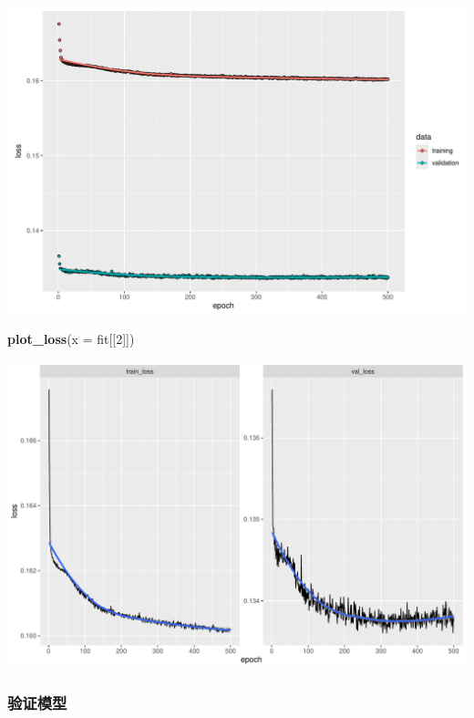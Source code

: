 \documentclass[
]{article}
\newenvironment{Shaded}{\begin{snugshade}}{\end{snugshade}}
\newcommand{\AttributeTok}[1]{\textcolor[rgb]{0.13,0.29,0.53}{#1}}
\newcommand{\CommentTok}[1]{\textcolor[rgb]{0.56,0.35,0.01}{\textit{#1}}}
\newcommand{\DecValTok}[1]{\textcolor[rgb]{0.00,0.00,0.81}{#1}}
\newcommand{\FunctionTok}[1]{\textcolor[rgb]{0.13,0.29,0.53}{\textbf{#1}}}
\newcommand{\NormalTok}[1]{#1}
\newcommand{\OtherTok}[1]{\textcolor[rgb]{0.56,0.35,0.01}{#1}}
\newcommand{\SpecialCharTok}[1]{\textcolor[rgb]{0.81,0.36,0.00}{\textbf{#1}}}
\begin{document}
\includegraphics{freMTPLfreq_fnn-zh-cn_files/figure-latex/unnamed-chunk-64-1.pdf}

\begin{Shaded}
\begin{Highlighting}[]
\FunctionTok{plot\_loss}\NormalTok{(}\AttributeTok{x =}\NormalTok{ fit[[}\DecValTok{2}\NormalTok{]])}
\end{Highlighting}
\end{Shaded}

\includegraphics{freMTPLfreq_fnn-zh-cn_files/figure-latex/unnamed-chunk-65-1.pdf}

\subsubsection{验证模型}\label{ux9a8cux8bc1ux6a21ux578b-3}

\begin{Shaded}
\end{Shaded}
\end{document}
